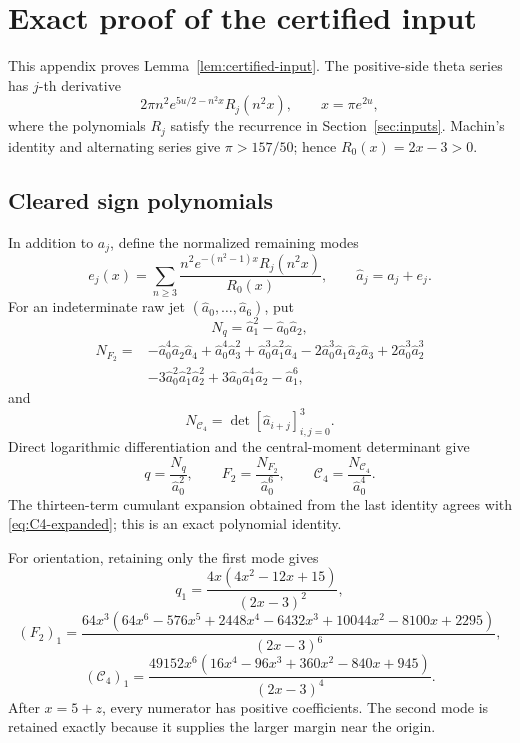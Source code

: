 \documentclass[11pt]{article}
\theoremstyle{remark}
\newcommand{\Cfour}{\mathcal{C}_4}
\newcommand{\secref}[1]{Section~\ref{#1}}
\numberwithin{equation}{section}
\begin{document}
\section{Exact proof of the certified input}\label{app:tail}

This appendix proves Lemma~\ref{lem:certified-input}. The positive-side
theta series has \(j\)-th derivative
\[
 2\pi n^2e^{5u/2-n^2x}R_j(n^2x),\qquad x=\pi e^{2u},
\]
where the polynomials \(R_j\) satisfy the recurrence in
\secref{sec:inputs}. Machin's identity and alternating series give
\(\pi>157/50\); hence \(R_0(x)=2x-3>0\).

\subsection{Cleared sign polynomials}

In addition to \(a_j\), define the normalized remaining modes
\[
 e_j(x)=\sum_{n\geq3}
 \frac{n^2e^{-(n^2-1)x}R_j(n^2x)}{R_0(x)},
 \qquad \widehat a_j=a_j+e_j.
\]
For an indeterminate raw jet \((\widehat a_0,\ldots,\widehat a_6)\), put
\[
 N_q=\widehat a_1^2-\widehat a_0\widehat a_2,
\]
\begin{align*}
N_{F_2}={}&-\widehat a_0^4\widehat a_2\widehat a_4
+\widehat a_0^4\widehat a_3^2
+\widehat a_0^3\widehat a_1^2\widehat a_4
-2\widehat a_0^3\widehat a_1\widehat a_2\widehat a_3
+2\widehat a_0^3\widehat a_2^3\\
&-3\widehat a_0^2\widehat a_1^2\widehat a_2^2
+3\widehat a_0\widehat a_1^4\widehat a_2-\widehat a_1^6,
\end{align*}
and
\[
 N_{\Cfour}=\det[\widehat a_{i+j}]_{i,j=0}^3.
\]
Direct logarithmic differentiation and the central-moment determinant give
\begin{equation}\label{eq:raw-signs}
 q=\frac{N_q}{\widehat a_0^2},\qquad
 F_2=\frac{N_{F_2}}{\widehat a_0^6},\qquad
 \Cfour=\frac{N_{\Cfour}}{\widehat a_0^4}.
\end{equation}
The thirteen-term cumulant expansion obtained from the last identity agrees
with \eqref{eq:C4-expanded}; this is an exact polynomial identity.

For orientation, retaining only the first mode gives
\[
q_1=\frac{4x(4x^2-12x+15)}{(2x-3)^2},
\]
\[
(F_2)_1=\frac{64x^3(64x^6-576x^5+2448x^4-6432x^3
+10044x^2-8100x+2295)}{(2x-3)^6},
\]
\[
(\Cfour)_1=\frac{49152x^6(16x^4-96x^3+360x^2-840x+945)}{(2x-3)^4}.
\]
After \(x=5+z\), every numerator has positive coefficients. The second
mode is retained exactly because it supplies the larger margin near the
origin.
\end{document}
